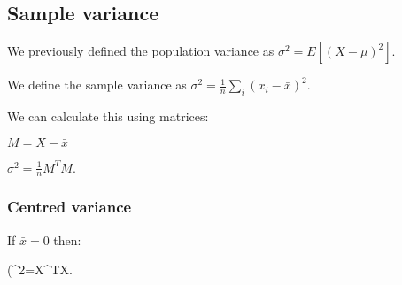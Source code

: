 
\subsection{Sample variance}

We previously defined the population variance as \(\sigma^2=E[(X-\mu)^2]\).

We define the sample variance as \(\sigma^2=\frac{1}{n}\sum_i(x_i-\bar x)^2\).

We can calculate this using matrices:

\(M=X-\bar x\)

\(\sigma^2=\frac{1}{n}M^TM\).

\subsubsection{Centred variance}

If \(\bar x =0\) then:

(\sigma^2=X^TX\).

